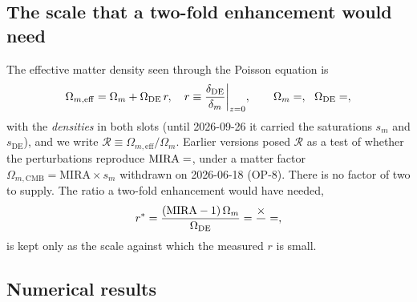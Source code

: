 \documentclass[12pt,a4paper]{article}
\newcommand{\sDE}{s_{\mathrm{DE}}}
\begin{document}
\subsection{The scale that a two-fold enhancement would need}
\label{subsec:MIRA_requirement}

The effective matter density seen through the Poisson equation is
\begin{equation}
  \Omega_{m,\mathrm{eff}} = \Omega_m + \Omega_{\mathrm{DE}}\,r,
  \quad r \equiv \frac{\delta_{\mathrm{DE}}}{\delta_m}\bigg|_{z=0},
  \qquad \Omega_m = \val{OMEGA_M_TOTAL_d6},\ \ \Omega_{\mathrm{DE}} = \val{OMDE_DENS_d6},
  \label{eq:Omeff}
\end{equation}
with the \emph{densities} in both slots (until 2026-09-26 it carried the saturations
$s_m$ and $\sDE$), and we write $\mathcal{R} \equiv \Omega_{m,\mathrm{eff}}/\Omega_m$.
Earlier versions posed $\mathcal{R}$ as a test of whether the perturbations
reproduce $\mathrm{MIRA}=\val{MIRA_d4}$, under a matter factor
$\Omega_{m,\mathrm{CMB}} = \mathrm{MIRA}\times s_m$ withdrawn on
2026-06-18 (OP-8). There is no factor of two to supply. The ratio a two-fold
enhancement would have needed,
\begin{equation}
  r^* = \frac{(\mathrm{MIRA}-1)\,\Omega_m}{\Omega_{\mathrm{DE}}}
  = \frac{\val{MIRA_m1_d6} \times \val{OMEGA_M_TOTAL_d6}}{\val{OMDE_DENS_d6}}
  = \val{r_star_q2},
  \label{eq:r_required}
\end{equation}
is kept only as the scale against which the measured $r$ is small.

\subsection{Numerical results}
\label{subsec:results_MIRA}
\end{document}
